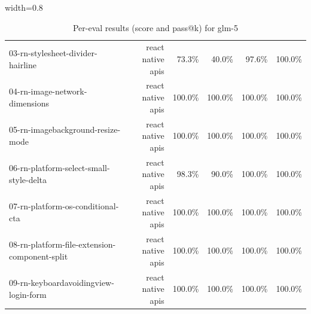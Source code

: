 \begin{table}[htbp]
\begin{adjustbox}{width=0.8\textwidth}
\begin{tabular}{lrrrrr}
03-rn-stylesheet-divider-hairline & react native apis & 73.3\% & 40.0\% & 97.6\% & 100.0\% \\
04-rn-image-network-dimensions & react native apis & 100.0\% & 100.0\% & 100.0\% & 100.0\% \\
05-rn-imagebackground-resize-mode & react native apis & 100.0\% & 100.0\% & 100.0\% & 100.0\% \\
06-rn-platform-select-small-style-delta & react native apis & 98.3\% & 90.0\% & 100.0\% & 100.0\% \\
07-rn-platform-os-conditional-cta & react native apis & 100.0\% & 100.0\% & 100.0\% & 100.0\% \\
08-rn-platform-file-extension-component-split & react native apis & 100.0\% & 100.0\% & 100.0\% & 100.0\% \\
09-rn-keyboardavoidingview-login-form & react native apis & 100.0\% & 100.0\% & 100.0\% & 100.0\% \\
\bottomrule
\end{tabular}
\end{adjustbox}
\caption{Per-eval results (score and pass@k) for glm-5}
\end{table}
